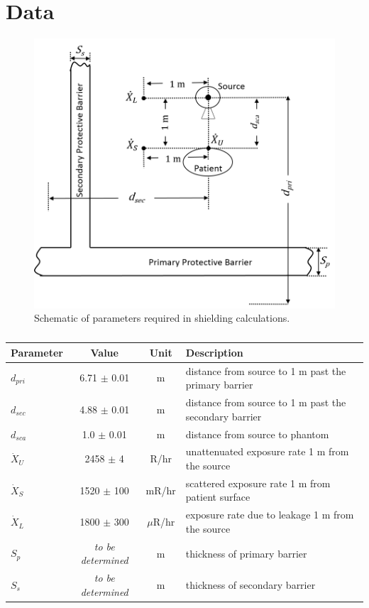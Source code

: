 \documentclass[11pt, oneside]{article}   	%
\begin{document}
\clearpage
\section{Data}

\begin{figure}[h!]
    \centering
    \includegraphics[scale=0.6]{shieldingParams.png}
        \caption{Schematic of parameters required in shielding calculations.}
    \label{fig:shieldingParams}
\end{figure}

\begin{table}[h!]
\centering
\caption{}
\label{tab:shieldingParams}
\begin{tabular}{|l|c|c|l|}
\hline
Parameter  & Value & Unit & Description \\
\hline 
$d_{pri}$ & 6.71 $\pm$ 0.01 & m & distance from source to 1 m past the primary barrier \\ \hline
$d_{sec}$ & 4.88 $\pm$ 0.01 & m & distance from source to 1 m past the secondary barrier \\ \hline
$d_{sca}$ & 1.0 $\pm$ 0.01 & m & distance from source to phantom \\ \hline
$\dot{X}_U$ & 2458 $\pm$ 4 & R/hr & unattenuated exposure rate 1 m from the source \\ \hline
$\dot{X}_S$ & 1520  $\pm$ 100 & mR/hr & scattered exposure rate 1 m from patient surface \\ \hline
$\dot{X}_L$ & 1800 $\pm$ 300 & $\mu$R/hr & exposure rate due to leakage 1 m from the source \\ \hline
$S_p$ & \textit{to be determined} & m & thickness of primary barrier \\ \hline
$S_s$ & \textit{to be determined} & m & thickness of secondary barrier \\ 
\hline
\end{tabular}
\end{table}
\end{document}
